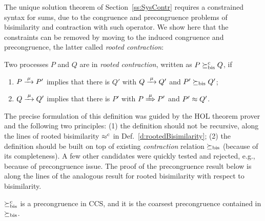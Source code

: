 The unique solution theorem of Section~\ref{ss:SysContr} requires a
constrained syntax for sums, due to the congruence and precongruence
problems of bisimilarity and contraction with such operator. 
We show here that the constraints can be
removed by moving to the induced congruence and precongruence, the
latter called \emph{rooted contraction}:
\begin{definition}
\label{d:rcontra}
Two processes $P$ and $Q$ are in \emph{rooted contraction}, written as
 $P\mathrel{\succeq^{\rm{c}}_{\rm{bis}}} Q$, if
\begin{enumerate}
\item $P \arr\mu P'$ implies that there is $Q'$ with $Q \arr \mu Q'$
 and $P'\mathrel{\succeq_{\rm{bis}}} Q'$;
\item $Q \arr\mu Q'$   implies that there is $P'$ with $P \Arr \mu
 P'$ and $P' \approx Q'$\enspace.
\end{enumerate}
\end{definition}


The precise formulation of  this definition was guided by the HOL theorem
prover and
the following two principles: (1) the definition should not be recursive,
along the lines of rooted bisimilarity
$\mathrel{\approx^{\rm{c}}}$ in Def.~\ref{d:rootedBisimilarity};
(2) the definition should  be built on top of existing \emph{contraction}
relation $\mathrel{\succeq_{\rm{bis}}}$ (because of its completeness). 
A few other candidates were quickly tested and rejected, e.g.,
  because of  precongruence issue. The proof of the precongruence
 result below is along the lines of the analogous result
for rooted bisimilarity with respect to bisimilarity.

\begin{theorem}
\label{t:rcontrPrecongruence}
$\mathrel{\succeq^{\rm{c}}_{\rm{bis}}}$ is a precongruence in CCS, and it is the
coarsest precongruence contained in $\mathrel{\succeq_{\rm{bis}}}$.
\end{theorem}  


